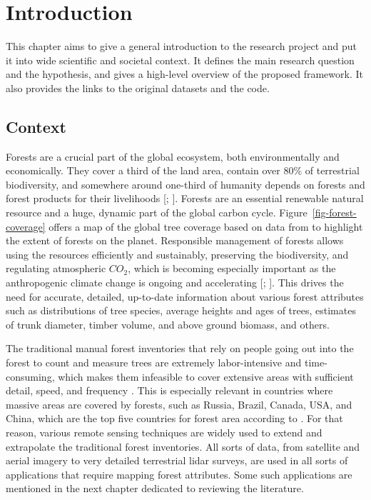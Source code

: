 \chapter{Introduction}\label{cap:introduction}

This chapter aims to give a general introduction to the research project and put it into wide scientific and societal context.
It defines the main research question and the hypothesis, and gives a high-level overview of the proposed framework.
It also provides the links to the original datasets and the code.

\section{Context}
Forests are a crucial part of the global ecosystem, both environmentally and economically.
They cover a third of the land area, contain over 80\% of terrestrial biodiversity, and somewhere around one-third of humanity depends on forests and forest products for their livelihoods [\citet{aertsForestRestorationBiodiversity2011}; \citet{StateWorldsForests2020}].
Forests are an essential renewable natural resource and a huge, dynamic part of the global carbon cycle.
Figure~\ref{fig-forest-coverage} offers a map of the global tree coverage based on data from \citet{hansenHighResolutionGlobalMaps2013} to highlight the extent of forests on the planet.
Responsible management of forests allows using the resources efficiently and sustainably, preserving the biodiversity, and regulating atmospheric $CO_2$, which is becoming especially important as the anthropogenic climate change is ongoing and accelerating [\citet{faheyForestCarbonStorage2010}; \citet{forsterIndicatorsGlobalClimate2024}].
This drives the need for accurate, detailed, up-to-date information about various forest attributes such as distributions of tree species, average heights and ages of trees, estimates of trunk diameter, timber volume, and above ground biomass, and others.

The traditional manual forest inventories that rely on people going out into the forest to count and measure trees are extremely labor-intensive and time-consuming, which makes them infeasible to cover extensive areas with sufficient detail, speed, and frequency \citep{burleyEncyclopediaForestSciences2004}.
This is especially relevant in countries where massive areas are covered by forests, such as Russia, Brazil, Canada, USA, and China, which are the top five countries for forest area according to \citet{GlobalForestResources2020}.
For that reason, various remote sensing techniques are widely used to extend and extrapolate the traditional forest inventories.
All sorts of data, from satellite and aerial imagery to very detailed terrestrial \gls{lidar} surveys, are used in all sorts of applications that require mapping forest attributes.
Some such applications are mentioned in the next chapter dedicated to reviewing the literature.

